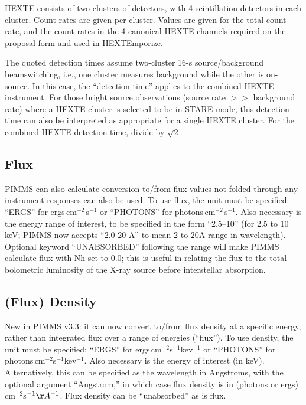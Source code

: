 \documentclass[11pt]{article}
\begin{document}
HEXTE consists of two clusters of
detectors, with 4 scintillation detectors in each cluster.  Count rates are 
given per cluster.  Values are given for the total count rate, and the count 
rates in the 4 canonical HEXTE channels required on the proposal form and 
used in HEXTEmporize.

The quoted detection times assume two-cluster 16-s source/background
beamswitching, i.e., one cluster measures background while the other is
on-source.  In this case, the ``detection time'' applies to the combined
HEXTE instrument.  For those bright source observations (source rate $>>$
background rate) where a HEXTE cluster is selected to be in STARE mode,
this detection time can also be interpreted as appropriate for a single
HEXTE cluster.  For the combined HEXTE detection time, divide by $\sqrt{2}$.

\subsection{Flux}

PIMMS can also calculate conversion to/from flux values not folded through
any instrument responses can also be used.  To use flux, the unit must be
specified: ``ERGS'' for ergs\,cm$^{-2}$\,s$^{-1}$ or ``PHOTONS'' for
photons\,cm$^{-2}$\,s$^{-1}$.  Also necessary is the energy
range of interest, to be specified in the form ``2.5--10'' (for 2.5 to 10 keV;
PIMMS now accepts ``2.0-20 A'' to mean 2 to 20A range in wavelength).
Optional keyword ``UNABSORBED'' following the range will make PIMMS calculate
flux with Nh set to 0.0; this is useful in relating the flux to the total
bolometric luminosity of the X-ray source before interstellar absorption.

\subsection{(Flux) Density}

New in PIMMS v3.3: it can now convert to/from flux density at a specific
energy, rather than integrated flux over a range of energies (``flux'').
To use density, the unit must be specified: ``ERGS'' for
ergs\,cm$^{-2}$s$^{-1}$kev$^{-1}$ or ``PHOTONS'' for
photons\,cm$^{-2}$s$^{-1}$kev$^{-1}$.  Also necessary is the energy of
interest (in keV).  Alternatively, this can be specified as the wavelength
in Angstroms, with the optional argument ``Angstrom,'' in which case flux
density is in (photons or ergs)\,cm$^{-2}$s$^{-1}\AA^{-1}$.
Flux density can be ``unabsorbed'' as is flux.
\end{document}
